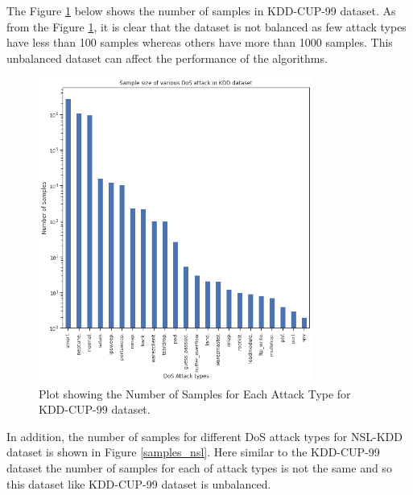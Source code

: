 \documentclass[conference]{IEEEtran}
\begin{document}
The Figure \ref{samples_kdd} below shows the number of samples in KDD-CUP-99 \cite{KDDcup99} dataset. As from the Figure \ref{samples_kdd}, it is clear that the dataset is not balanced as few attack types have less than 100 samples whereas others have more than 1000 samples. This unbalanced dataset can affect the performance of the algorithms.  

\begin{figure}[h]
\includegraphics[width=9cm]{KDD_Sample.png}\par
\caption{Plot showing the Number of Samples for Each Attack Type for KDD-CUP-99 dataset.}
\label{samples_kdd}
\end{figure}

In addition, the number of samples for different DoS attack types for NSL-KDD \cite{NSL_kdd} dataset is shown in Figure \ref{samples_nsl}. Here similar to the KDD-CUP-99 dataset the number of samples for each of attack types is not the same and so this dataset like KDD-CUP-99 dataset is unbalanced. 
\end{document}

